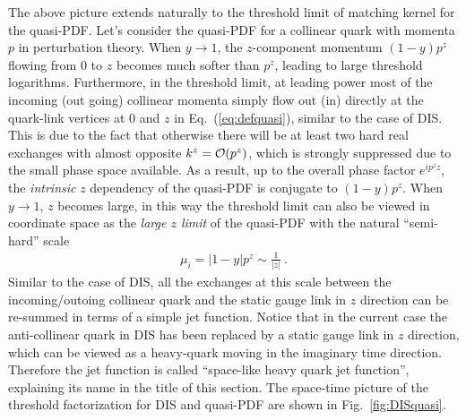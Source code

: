 \documentclass[a4paper,11pt]{article}
\begin{document}
The above picture extends naturally to the threshold limit of matching kernel for the quasi-PDF. Let's consider the 
quasi-PDF for a collinear quark with momenta $p$ in perturbation theory.  When $y \rightarrow 1$, the $z$-component momentum $(1-y)p^z$ flowing from $0$ to $z$ becomes much softer than $p^z$, leading to large threshold logarithms. Furthermore, in the threshold limit, at leading power most of the incoming (out going) collinear momenta simply flow out (in) directly at the quark-link vertices at $0$ and $z$ in Eq.~(\ref{eq:defquasi}), similar to the case of DIS. This is due to the fact that otherwise there will be at least two hard real exchanges with almost opposite $k^z={\cal O}(p^z)$, which is strongly suppressed due to the small phase space available.  As a result, up to the overall phase factor $e^{ip^z z}$,  the {\it intrinsic} $z$ dependency of the quasi-PDF is conjugate to $(1-y)p^z$. When $y \rightarrow 1$, $z$ becomes large, in this way the threshold limit can also be viewed in coordinate space as the {\it large $z$ limit} of the quasi-PDF with the natural ``semi-hard'' scale 
\begin{align}
\mu_i=|1-y|p^z\sim \frac{1}{|z|} \ .
\end{align}
Similar to the case of DIS, all the exchanges at this scale between the incoming/outoing collinear quark and the 
static gauge link in $z$ direction can be re-summed in terms of a simple jet function. Notice that in the current case the anti-collinear quark in DIS has been replaced by a static gauge link in $z$ direction, which can be viewed as a heavy-quark moving in the imaginary time direction. Therefore the jet function is called ``space-like heavy quark jet function'', explaining its name in the title of this section. The space-time picture of the threshold factorization for DIS and quasi-PDF are shown in Fig.~\ref{fig:DISquasi}.
\end{document}

